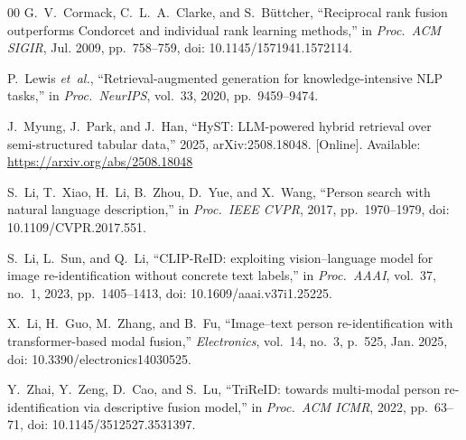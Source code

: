 ﻿\documentclass[conference]{IEEEtran}
\theoremstyle{definition}
\begin{document}
\begin{thebibliography}{00}
 G.~V.~Cormack, C.~L.~A.~Clarke, and S.~B\"uttcher, ``Reciprocal rank fusion outperforms Condorcet and individual rank learning methods,'' in \emph{Proc.\ ACM SIGIR}, Jul. 2009, pp.~758--759, doi: 10.1145/1571941.1572114.

 P.~Lewis \emph{et~al.}, ``Retrieval-augmented generation for knowledge-intensive NLP tasks,'' in \emph{Proc.\ NeurIPS}, vol.~33, 2020, pp.~9459--9474.

 J.~Myung, J.~Park, and J.~Han, ``HyST: LLM-powered hybrid retrieval over semi-structured tabular data,'' 2025, arXiv:2508.18048. [Online]. Available: \url{https://arxiv.org/abs/2508.18048}

 S.~Li, T.~Xiao, H.~Li, B.~Zhou, D.~Yue, and X.~Wang, ``Person search with natural language description,'' in \emph{Proc.\ IEEE CVPR}, 2017, pp.~1970--1979, doi: 10.1109/CVPR.2017.551.

 S.~Li, L.~Sun, and Q.~Li, ``CLIP-ReID: exploiting vision--language model for image re-identification without concrete text labels,'' in \emph{Proc.\ AAAI}, vol.~37, no.~1, 2023, pp.~1405--1413, doi: 10.1609/aaai.v37i1.25225.

 X.~Li, H.~Guo, M.~Zhang, and B.~Fu, ``Image--text person re-identification with transformer-based modal fusion,'' \emph{Electronics}, vol.~14, no.~3, p.~525, Jan. 2025, doi: 10.3390/electronics14030525.

 Y.~Zhai, Y.~Zeng, D.~Cao, and S.~Lu, ``TriReID: towards multi-modal person re-identification via descriptive fusion model,'' in \emph{Proc.\ ACM ICMR}, 2022, pp.~63--71, doi: 10.1145/3512527.3531397.

\end{thebibliography}
\end{document}
